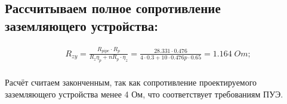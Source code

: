 \subsection{Рассчитываем полное сопротивление заземляющего устройства:}

\begin{equation}
    \begin{split}	
        &R_{zy} = \frac{R_{pipe}\cdot R_p}{R_z \eta_{p} + nR_p\cdot \eta_{z}} = \frac{28.331\cdot 0.476}{4\cdot 0.3 + 10\cdot 0.476p\cdot 0.65} = 1.164\; Om;\\
    \end{split}
\end{equation}

Расчёт считаем законченным, так как сопротивление проектируемого заземляющего устройства менее 4 Ом, что соответствует требованиям ПУЭ.





